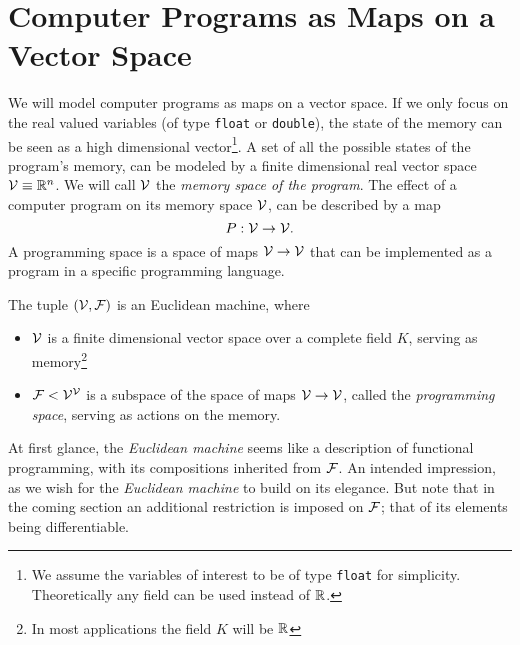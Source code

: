 \section{Computer Programs as Maps on a Vector Space}

We will model computer programs as maps on a vector space. If
we only focus on the real valued variables (of type \texttt{float} or
\texttt{double}), the state of the memory can be seen as a high
dimensional vector\footnote{We assume the variables of interest to be of type \texttt{float} for
  simplicity. Theoretically any field can be used instead of $\mathbb{R}$.}. 
A set of all the possible states of the program's memory,
can be modeled by a finite dimensional real vector space $\mathcal{V}\equiv \mathbb{R}^n$. We
will call $\mathcal{V}$ the \emph{memory space of the program}. The effect of a computer
program on its memory space $\mathcal{V}$, can be described by a map
\begin{equation}
  \label{eq:map}
  P:\mathcal{V}\to \mathcal{V}.
\end{equation}
A programming space is a space of maps $\mathcal{V}\to\mathcal{V}$ that can be implemented as a
program in a specific programming language. 
\begin{definition} The tuple $(\mathcal{V},\mathcal{F})$ is an Euclidean machine, where
  \begin{itemize}
  \item
  $\mathcal{V}$ is a finite dimensional vector space over a complete field $K$, serving
  as memory\footnote{In most applications the field $K$ will
    be $\mathbb{R}$}
  \item
  $\mathcal{F}< \mathcal{V}^{\mathcal{V}}$ is a subspace of the space of maps $\mathcal{V}\to \mathcal{V}$, called the \emph{programming space}, serving as actions on the memory.
  \end{itemize}  
\end{definition}

At first glance, the \emph{Euclidean machine} seems like a description of functional programming, with its compositions inherited from $\mathcal{F}$. An intended impression, as we wish for the \emph{Euclidean machine} to build on its elegance. But note that in the coming section an additional restriction is imposed on $\mathcal{F}$; that of its elements being differentiable.


